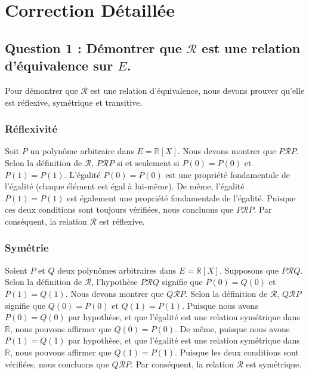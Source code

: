 \documentclass{report}
\begin{document}
\section*{Correction Détaillée}

\subsection*{Question 1 : Démontrer que $\mathcal{R}$ est une relation d'équivalence sur $E$.}

Pour démontrer que $\mathcal{R}$ est une relation d'équivalence, nous devons prouver qu'elle est réflexive, symétrique et transitive.

\subsubsection*{Réflexivité}
Soit $P$ un polynôme arbitraire dans $E = \mathbb{R}[X]$.
Nous devons montrer que $P \mathcal{R} P$.
Selon la définition de $\mathcal{R}$, $P \mathcal{R} P$ si et seulement si $P(0) = P(0)$ et $P(1) = P(1)$.
L'égalité $P(0) = P(0)$ est une propriété fondamentale de l'égalité (chaque élément est égal à lui-même).
De même, l'égalité $P(1) = P(1)$ est également une propriété fondamentale de l'égalité.
Puisque ces deux conditions sont toujours vérifiées, nous concluons que $P \mathcal{R} P$.
Par conséquent, la relation $\mathcal{R}$ est réflexive.

\subsubsection*{Symétrie}
Soient $P$ et $Q$ deux polynômes arbitraires dans $E = \mathbb{R}[X]$.
Supposons que $P \mathcal{R} Q$.
Selon la définition de $\mathcal{R}$, l'hypothèse $P \mathcal{R} Q$ signifie que $P(0) = Q(0)$ et $P(1) = Q(1)$.
Nous devons montrer que $Q \mathcal{R} P$.
Selon la définition de $\mathcal{R}$, $Q \mathcal{R} P$ signifie que $Q(0) = P(0)$ et $Q(1) = P(1)$.
Puisque nous avons $P(0) = Q(0)$ par hypothèse, et que l'égalité est une relation symétrique dans $\mathbb{R}$, nous pouvons affirmer que $Q(0) = P(0)$.
De même, puisque nous avons $P(1) = Q(1)$ par hypothèse, et que l'égalité est une relation symétrique dans $\mathbb{R}$, nous pouvons affirmer que $Q(1) = P(1)$.
Puisque les deux conditions sont vérifiées, nous concluons que $Q \mathcal{R} P$.
Par conséquent, la relation $\mathcal{R}$ est symétrique.
\end{document}
